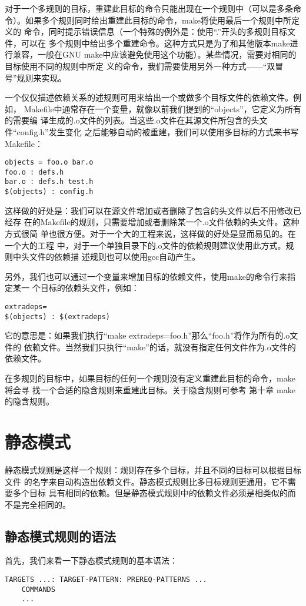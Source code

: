对于一个多规则的目标，重建此目标的命令只能出现在一个规则中（可以是多条命
令）。如果多个规则同时给出重建此目标的命令，make将使用最后一个规则中所定义的
命令，同时提示错误信息（一个特殊的例外是：使用“.”开头的多规则目标文件，可以在
多个规则中给出多个重建命令。这种方式只是为了和其他版本make进行兼容，一般在GNU
make中应该避免使用这个功能）。某些情况，需要对相同的目标使用不同的规则中所定
义的命令，我们需要使用另外一种方式——“双冒号”规则来实现。

一个仅仅描述依赖关系的述规则可用来给出一个或做多个目标文件的依赖文件。例如，
Makefile中通常存在一个变量，就像以前我们提到的“objects”，它定义为所有的需要编
译生成的.o文件的列表。当这些.o文件在其源文件所包含的头文件“config.h”发生变化
之后能够自动的被重建，我们可以使用多目标的方式来书写Makefile：
\begin{Verbatim}[]
objects = foo.o bar.o
foo.o : defs.h
bar.o : defs.h test.h
$(objects) : config.h
\end{Verbatim}

这样做的好处是：我们可以在源文件增加或者删除了包含的头文件以后不用修改已经存
在的Makefile的规则，只需要增加或者删除某一个.o文件依赖的头文件。这种方式很简
单也很方便。对于一个大的工程来说，这样做的好处是显而易见的。在一个大的工程
中，对于一个单独目录下的.o文件的依赖规则建议使用此方式。规则中头文件的依赖描
述规则也可以使用gcc自动产生。

另外，我们也可以通过一个变量来增加目标的依赖文件，使用make的命令行来指定某一
个目标的依赖头文件，例如：

\begin{Verbatim}[]
extradeps=
$(objects) : $(extradeps)
\end{Verbatim}

它的意思是：如果我们执行“make extradeps=foo.h”那么“foo.h”将作为所有的.o文件的
依赖文件。当然我们只执行“make”的话，就没有指定任何文件作为.o文件的依赖文件。

在多规则的目标中，如果目标的任何一个规则没有定义重建此目标的命令，make将会寻
找一个合适的隐含规则来重建此目标。关于隐含规则可参考 第十章 make的隐含规则。

\section{静态模式}
静态模式规则是这样一个规则：规则存在多个目标，并且不同的目标可以根据目标文件
的名字来自动构造出依赖文件。静态模式规则比多目标规则更通用，它不需要多个目标
具有相同的依赖。但是静态模式规则中的依赖文件必须是相类似的而不是完全相同的。

\subsection{静态模式规则的语法}
首先，我们来看一下静态模式规则的基本语法：
\begin{Verbatim}[]
TARGETS ...: TARGET-PATTERN: PREREQ-PATTERNS ...
    COMMANDS
    ...
\end{Verbatim}

